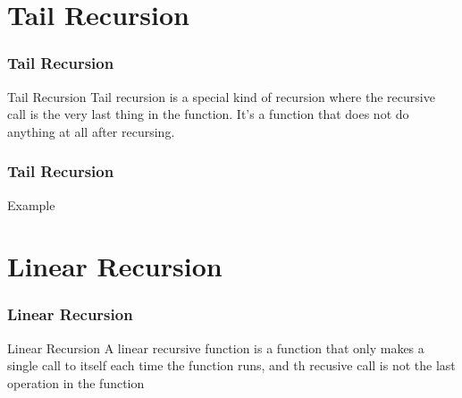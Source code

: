 \documentclass{beamer}
\begin{document}
\section{Tail Recursion}
\begin{frame}
	\frametitle{Tail Recursion}
	\begin{block}{Tail Recursion}
		Tail recursion is a special kind of recursion where the recursive call is the very last thing in the function. It's a function that does not do anything at all after recursing.
		\begin{center}
				\begin{algorithmic}[1]
					\State{}
				\Else
					\State{}
				\EndIf
				\EndProcedure
			\end{algorithmic}
		\end{center}
	\end{block}
\end{frame}
\begin{frame}
	\frametitle{Tail Recursion}
	\begin{block}{Example}
				\begin{algorithmic}[1]
					\State{}
				\Else
					\State{}
				\EndIf
				\EndProcedure
			\end{algorithmic}
	\end{block}
\end{frame}
\section{Linear Recursion}
\begin{frame}
	\frametitle{Linear Recursion}
	\begin{block}{Linear Recursion}
		A linear recursive function is a function that only makes a single call to itself each time the function runs, and th recusive call is not the last operation in the function
				\begin{algorithmic}[1]
					\State{}
				\Else
					\State{}
				\EndIf
				\EndProcedure
			\end{algorithmic}
	\end{block}
\end{frame}
\end{document}
